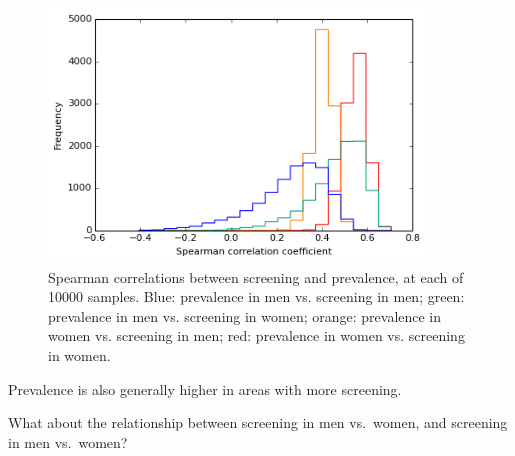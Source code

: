 \documentclass{article}
\begin{document}
    \begin{figure}
        \begin{center}\includegraphics[width=10cm]{local_authorities_files/local_authorities_40_1.png}\end{center}
        \caption{Spearman correlations between screening and prevalence, at each of 10000 samples. Blue: prevalence in men vs. screening in men; green: prevalence in men vs. screening in women; orange: prevalence in women vs. screening in men; red: prevalence in women vs. screening in women.}
        \label{}
    \end{figure}
    
    Prevalence is also generally higher in areas with more screening.

What about the relationship between screening in men vs.~women, and
screening in men vs.~women?
\end{document}
